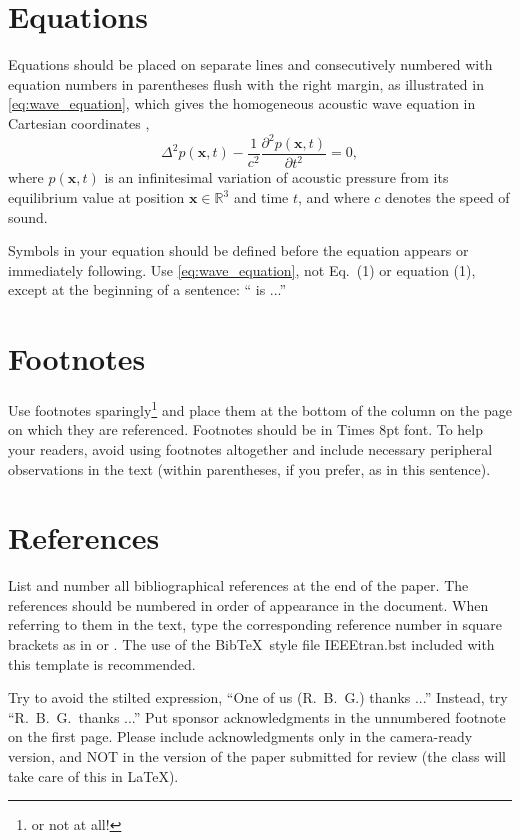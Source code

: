 \documentclass[9pt]{ieeeconf}
\newcommand{\RR}{\mathbb{R}}
\begin{document}
\section{Equations}
\label{sec:equations}

Equations should be placed on separate lines and consecutively numbered with equation numbers in parentheses flush with the right margin, as illustrated in \cref{eq:wave_equation}, which gives the homogeneous acoustic wave equation in Cartesian coordinates \cite{eWilliams1999},
\begin{equation}
  \label{eq:wave_equation}
    \Delta^2p(\bm{x},t)-
    \displaystyle\frac{1}{c^2}\frac{\partial^2p(\bm{x},t)}{\partial t^2}=0,
\end{equation}
where $p(\bm{x},t)$ is an infinitesimal variation of acoustic pressure from its equilibrium value at position $\bm{x}\in\RR^3$ and time $t$, and where $c$ denotes the speed of sound.

Symbols in your equation should be defined before the equation appears or immediately following.  Use \cref{eq:wave_equation}, not Eq.~(1) or equation (1), except at the beginning of a sentence: `` is ...''


\section{Footnotes}
\label{sec:foot}

Use footnotes sparingly\footnote{or not at all!} and place them at the bottom of the column on the page on which they are referenced. Footnotes should be in Times 8pt font. To help your readers, avoid using footnotes altogether and include necessary peripheral observations in the text (within parentheses, if you prefer, as in this sentence).


\section{References}
\label{sec:ref}

List and number all bibliographical references at the end of the paper. The references should be numbered in order of appearance in the document. When referring to them in the text, type the corresponding reference number in square brackets as in \cite{cJones2026,aSmith2026} or \cite{eWilliams1999,cJones2026,aSmith2026}. The use of the Bib\TeX\ style file IEEEtran.bst included with this template is recommended.


\begin{acknowledgments}
Try to avoid the stilted expression, ``One of us (R.\ B.\ G.) thanks ...'' Instead, try ``R.\ B.\ G.\ thanks ...''  Put sponsor acknowledgments in the unnumbered footnote on the first page. Please include acknowledgments only in the camera-ready version, and NOT in the version of the paper submitted for review (the class will take care of this in \LaTeX).
\end{acknowledgments}
\end{document}
